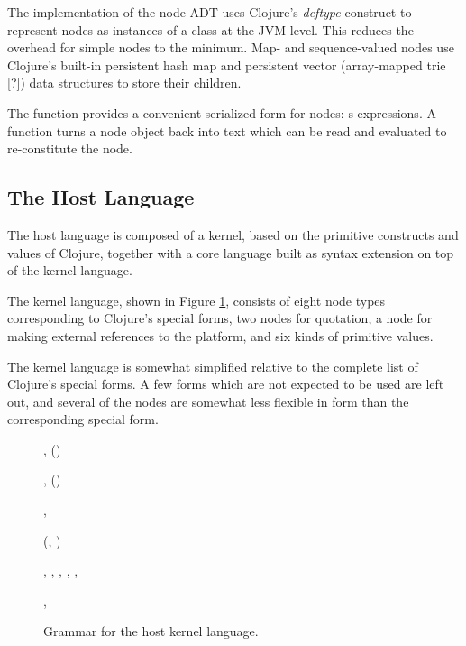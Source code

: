 The implementation of the node ADT uses Clojure's \emph{deftype} construct to represent nodes as instances of a  class at the JVM level. This reduces the overhead for simple nodes to the minimum. Map- and sequence-valued nodes use Clojure's built-in persistent hash map and persistent vector (array-mapped trie [?]) data structures to store their children.

The  function provides a convenient serialized form for nodes: s-expressions. A  function turns a node object back into text which can be read and evaluated to re-constitute the node.


\subsection{The Host Language}
The host language is composed of a kernel, based on the primitive constructs and values of Clojure, together with a core language built as syntax extension on top of the kernel language.

The kernel language, shown in Figure \ref{fig-kernel}, consists of eight node types corresponding to Clojure's special forms, two nodes for quotation, a node for making external references to the platform, and six kinds of primitive values. 

The kernel language is somewhat simplified relative to the complete list of Clojure's special forms. A few forms which are not expected to be used are left out, and several of the nodes are somewhat less flexible in form than the corresponding special form.

\begin{figure}

, ()

, ()

, 



(, )


, , , , , 

, 

\caption{\label{fig-kernel} Grammar for the host kernel language.}
\end{figure}

